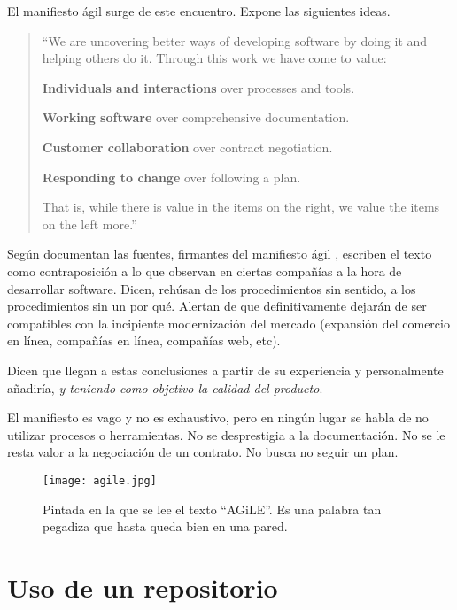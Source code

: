 El manifiesto ágil \cite{ManifiestoAgil} surge de este encuentro. Expone las siguientes ideas.

\begin{quote}
    \itshape{
    ``We are uncovering better ways of developing
    software by doing it and helping others do it.
    Through this work we have come to value:
    
    \textbf{Individuals and interactions} over processes and tools.

    \textbf{Working software} over comprehensive documentation.

    \textbf{Customer collaboration} over contract negotiation.

    \textbf{Responding to change} over following a plan.
    
    That is, while there is value in the items on
    the right, we value the items on the left more.''
    }
\end{quote}

Según documentan las fuentes, firmantes del manifiesto ágil \cite{ManifiestoAgil}, 
escriben el texto como contraposición a lo que observan en ciertas compañías a la
hora de desarrollar software. Dicen, rehúsan de los procedimientos sin sentido,
a los procedimientos sin un por qué. Alertan de que definitivamente dejarán de ser
compatibles con la incipiente modernización del mercado (expansión del comercio en
línea, compañías en línea, compañías web, etc). \cite{HistoriaManifiestoAgilJim}

Dicen que llegan a estas conclusiones a partir de su experiencia \cite{HistoriaManifiestoAgilJim}
y personalmente añadiría, \textit{y teniendo como objetivo la calidad del producto}.

El manifiesto es vago y no es exhaustivo, pero en ningún lugar se habla de no utilizar
procesos o herramientas.
No se desprestigia a la documentación. No se le resta valor a la negociación
de un contrato. No busca no seguir un plan.

\begin{figure}[h]
    \centering
    \texttt{[image: agile.jpg]}
    \caption{Pintada en la que se lee el texto ``AGiLE''. Es una palabra tan pegadiza
    que hasta queda bien en una pared.}
\end{figure}

\section{Uso de un repositorio}

